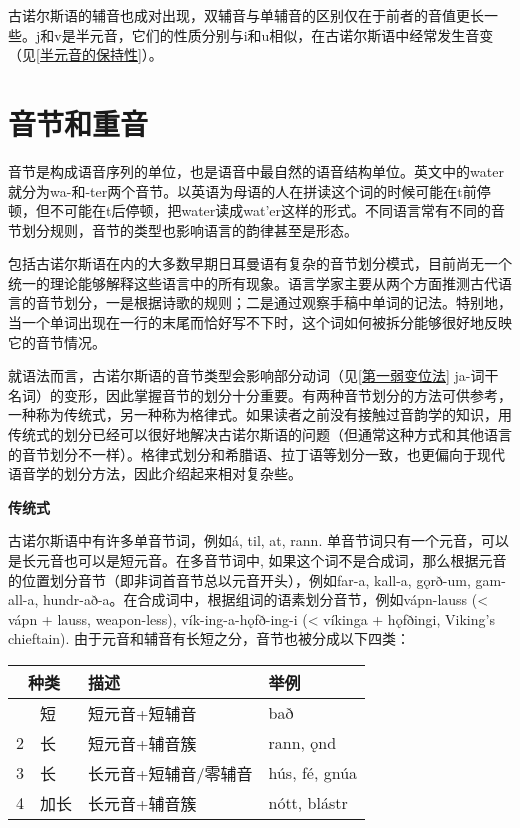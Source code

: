 古诺尔斯语的辅音也成对出现，双辅音与单辅音的区别仅在于前者的音值更长一些。j和v是半元音，它们的性质分别与i和u相似，在古诺尔斯语中经常发生音变（见\ref{半元音的保持性}）。

\section{音节和重音}\label{音节和重音}

音节是构成语音序列的单位，也是语音中最自然的语音结构单位。英文中的water就分为wa-和-ter两个音节。以英语为母语的人在拼读这个词的时候可能在t前停顿，但不可能在t后停顿，把water读成wat'er这样的形式。不同语言常有不同的音节划分规则，音节的类型也影响语言的韵律甚至是形态。

包括古诺尔斯语在内的大多数早期日耳曼语有复杂的音节划分模式，目前尚无一个统一的理论能够解释这些语言中的所有现象。语言学家主要从两个方面推测古代语言的音节划分，一是根据诗歌的规则；二是通过观察手稿中单词的记法。特别地，当一个单词出现在一行的末尾而恰好写不下时，这个词如何被拆分能够很好地反映它的音节情况。

就语法而言，古诺尔斯语的音节类型会影响部分动词（见\ref{第一弱变位法}
ja-词干名词）的变形，因此掌握音节的划分十分重要。有两种音节划分的方法可供参考，一种称为传统式，另一种称为格律式。如果读者之前没有接触过音韵学的知识，用传统式的划分已经可以很好地解决古诺尔斯语的问题（但通常这种方式和其他语言的音节划分不一样）。格律式划分和希腊语、拉丁语等划分一致，也更偏向于现代语音学的划分方法，因此介绍起来相对复杂些。

\textbf{传统式}

古诺尔斯语中有许多单音节词，例如á, til, at, rann.
单音节词只有一个元音，可以是长元音也可以是短元音。在多音节词中,
如果这个词不是合成词，那么根据元音的位置划分音节（即非词首音节总以元音开头），例如far-a,
kall-a, gǫrð-um, gam-all-a,
hundr-að-a。在合成词中，根据组词的语素划分音节，例如vápn-lauss
(\textless{} vápn + lauss, weapon-less), vík-ing-a-hǫfð-ing-i
(\textless{} víkinga + hǫfðingi, Viking's chieftain).
由于元音和辅音有长短之分，音节也被分成以下四类：

\begin{longtable}{llll}
  \toprule
  \multicolumn{2}{c}{种类} & 描述 & 举例                          \\
  \midrule
  \endhead
  \bottomrule
  \endfoot
  1                      & 短  & 短元音+短辅音     & bað           \\
  2                      & 长  & 短元音+辅音簇     & rann, ǫnd     \\
  3                      & 长  & 长元音+短辅音/零辅音 & hús, fé, gnúa \\
  4                      & 加长 & 长元音+辅音簇     & nótt, blástr  \\
\end{longtable}

